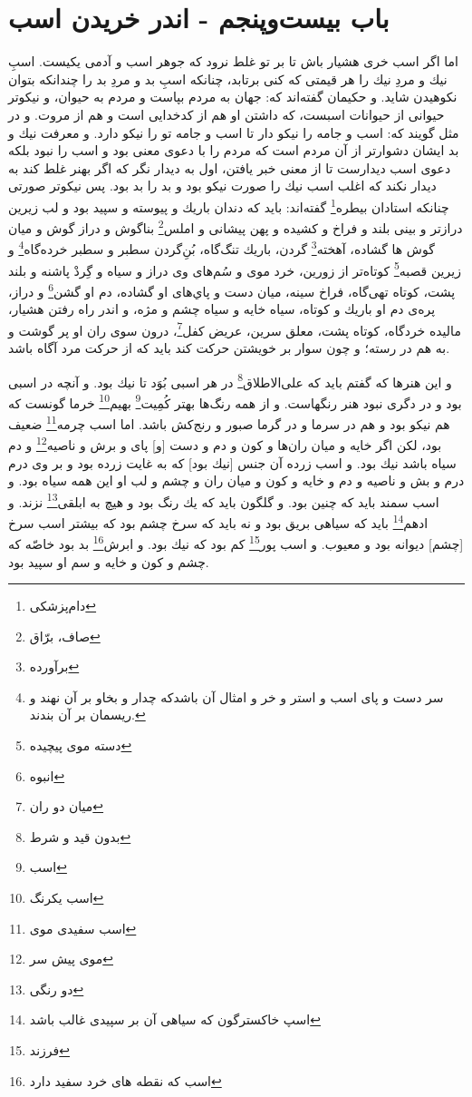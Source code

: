 \section*{باب بیست‌و‌پنجم - 
اندر خریدن اسب}

اما اگر اسب خرى هشيار باش تا بر تو غلط نرود كه جوهر اسب و آدمى يكيست.  اسب‌ِ نيك و مردِ نيك را هر قيمتى كه كنى برتابد، چنانكه اسبِ بد و مردِ بد را چندانكه بتوان نكوهيدن شايد. و حكيمان گفته‌اند كه: جهان به مردم بپاست و مردم به حيوان، و نيكوتر حيوانى از حيوانات اسبست، كه داشتن او هم از كدخدايى است و هم از مروت. و در مثل گويند كه: اسب و جامه را نيكو دار تا اسب و جامه تو را نيكو دارد. و معرفت نيك و بد ايشان دشوارتر از آن مردم است كه مردم را با دعوى معنى بود و اسب را نبود بلكه دعوى اسب ديدارست تا از معنى خبر يافتن، اول به ديدار نگر كه اگر بهنر غلط كند به ديدار نكند كه اغلب اسب نيك را صورت نيكو بود و بد را بد بود. پس نيكوتر صورتى چنانكه استادان بيطره\footnote{دام‌پزشکی} گفته‌اند: بايد كه دندان باريك و پيوسته و سپيد بود و لب زيرين درازتر و بينى بلند و فراخ و كشيده و پهن پيشانى و املس\footnote{صاف، برّاق} بناگوش و دراز گوش و ميان گوش ها گشاده، آهخته\footnote{برآورده} گردن، باريك تنگ‌گاه، بُن‌ِ‌گردن سطبر و سطبر خرده‌گاه\footnote{سر دست و پای اسب و استر و خر و امثال آن باشدکه چدار و بخاو بر آن نهند و ریسمان بر آن بندند.} و زيرين قصبه\footnote{دسته موی پیچیده} كوتاه‌تر از زورين، خرد موى و سُم‌هاى وى دراز و سياه و گِردْ پاشنه و بلند پشت، كوتاه تهى‌گاه، فراخ سينه، ميان دست و پاي‌هاى او گشاده، دم او گشن\footnote{انبوه} و دراز، پره‌ی دم او باريك و كوتاه، سياه خايه و سياه چشم و مژه، و اندر راه رفتن هشيار، ماليده خردگاه، كوتاه پشت، معلق سرين، عريض كفل\footnote{میان دو ران}، درون سوى ران او پر گوشت و به هم در رسته؛ و چون سوار بر خويشتن حركت كند بايد كه از حركت مرد آگاه باشد.

و اين هنرها كه گفتم بايد كه على‌الاطلاق\footnote{بدون قید و شرط} در هر اسبى بُوَد تا نيك بود. و آنچه در اسبى بود و در دگرى نبود هنر رنگهاست. و از همه رنگ‌ها بهتر كُمِيت\footnote{اسب} بهيم\footnote{اسب یکرنگ} خرما گونست كه هم نيكو بود و هم در سرما و در گرما صبور و رنج‌كش باشد. اما اسب چرمه\footnote{اسب سفیدی موی} ضعيف بود، لكن اگر خايه و ميان ران‌ها و كون و دم و دست [و] پاى و برش و ناصيه\footnote{ موی پیش سر} و دم سياه باشد نيك بود. و اسب زرده آن جنس [نيك بود] كه به غايت زرده بود و بر وى درم درم و بش و ناصيه و دم و خايه و كون و ميان ران و چشم و لب او اين همه سياه بود. و اسب سمند بايد كه چنين بود. و گلگون بايد كه يك رنگ بود و هيچ به ابلقى\footnote{دو رنگی} نزند. و ادهم\footnote{اسپ خاکسترگون که سیاهی آن بر سپیدی غالب باشد} بايد كه سياهى بريق بود و نه بايد كه سرخ چشم بود كه بيشتر اسب سرخ [چشم] ديوانه بود و معيوب. و اسب پور\footnote{فرزند} كم بود كه نيك بود. و ابرش\footnote{اسب که نقطه های خرد سفید دارد} بد بود خاصّه كه چشم و كون و خايه و سم او سپيد بود.

